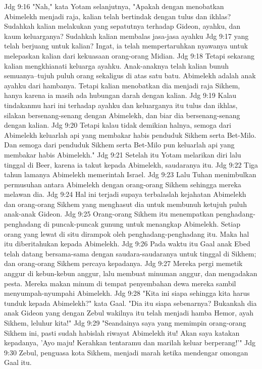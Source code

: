 Jdg 9:16  "Nah," kata Yotam selanjutnya, "Apakah dengan menobatkan Abimelekh menjadi raja, kalian telah bertindak dengan tulus dan ikhlas? Sudahkah kalian melakukan yang sepatutnya terhadap Gideon, ayahku, dan kaum keluarganya? Sudahkah kalian membalas jasa-jasa ayahku
Jdg 9:17  yang telah berjuang untuk kalian? Ingat, ia telah mempertaruhkan nyawanya untuk melepaskan kalian dari kekuasaan orang-orang Midian.
Jdg 9:18  Tetapi sekarang kalian mengkhianati keluarga ayahku. Anak-anaknya telah kalian bunuh semuanya--tujuh puluh orang sekaligus di atas satu batu. Abimelekh adalah anak ayahku dari hambanya. Tetapi kalian menobatkan dia menjadi raja Sikhem, hanya karena ia masih ada hubungan darah dengan kalian.
Jdg 9:19  Kalau tindakanmu hari ini terhadap ayahku dan keluarganya itu tulus dan ikhlas, silakan bersenang-senang dengan Abimelekh, dan biar dia bersenang-senang dengan kalian.
Jdg 9:20  Tetapi kalau tidak demikian halnya, semoga dari Abimelekh keluarlah api yang membakar habis penduduk Sikhem serta Bet-Milo. Dan semoga dari penduduk Sikhem serta Bet-Milo pun keluarlah api yang membakar habis Abimelekh."
Jdg 9:21  Setelah itu Yotam melarikan diri lalu tinggal di Beer, karena ia takut kepada Abimelekh, saudaranya itu.
Jdg 9:22  Tiga tahun lamanya Abimelekh memerintah Israel.
Jdg 9:23  Lalu Tuhan menimbulkan permusuhan antara Abimelekh dengan orang-orang Sikhem sehingga mereka melawan dia.
Jdg 9:24  Hal ini terjadi supaya terbalaslah kejahatan Abimelekh dan orang-orang Sikhem yang menghasut dia untuk membunuh ketujuh puluh anak-anak Gideon.
Jdg 9:25  Orang-orang Sikhem itu menempatkan penghadang-penghadang di puncak-puncak gunung untuk menangkap Abimelekh. Setiap orang yang lewat di situ dirampok oleh penghadang-penghadang itu. Maka hal itu diberitahukan kepada Abimelekh.
Jdg 9:26  Pada waktu itu Gaal anak Ebed telah datang bersama-sama dengan saudara-saudaranya untuk tinggal di Sikhem; dan orang-orang Sikhem percaya kepadanya.
Jdg 9:27  Mereka pergi memetik anggur di kebun-kebun anggur, lalu membuat minuman anggur, dan mengadakan pesta. Mereka makan minum di tempat penyembahan dewa mereka sambil menyumpah-nyumpahi Abimelekh.
Jdg 9:28  "Kita ini siapa sehingga kita harus tunduk kepada Abimelekh?" kata Gaal. "Dia itu siapa sebenarnya? Bukankah dia anak Gideon yang dengan Zebul wakilnya itu telah menjadi hamba Hemor, ayah Sikhem, leluhur kita!"
Jdg 9:29  "Seandainya saya yang memimpin orang-orang Sikhem ini, pasti sudah habislah riwayat Abimelekh itu! Akan saya katakan kepadanya, 'Ayo maju! Kerahkan tentaramu dan marilah keluar berperang!'"
Jdg 9:30  Zebul, penguasa kota Sikhem, menjadi marah ketika mendengar omongan Gaal itu.
